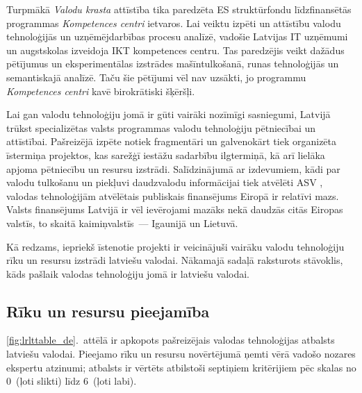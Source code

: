 \begin{multicols}{2}
Turpmākā \textit{Valodu krasta} attīstība tika paredzēta ES struktūrfondu līdzfinansētās programmas \textit{Kompetences centri} ietvaros.
Lai veiktu izpēti un attīstību valodu tehnoloģijās un uzņēmējdarbības procesu analīzē, vadošie Latvijas IT uzņēmumi un augstskolas izveidoja IKT kompetences centru.
Tas paredzējis veikt dažādus pētījumus un eksperimentālas izstrādes mašīntulkošanā, runas tehnoloģijās un semantiskajā analīzē.
Taču šie pētījumi vēl nav uzsākti, jo programmu \textit{Kompetences centri} kavē birokrātiski šķēršļi.

Lai gan valodu tehnoloģiju jomā ir gūti vairāki nozīmīgi sasniegumi, Latvijā trūkst specializētas valsts programmas valodu tehnoloģiju pētniecībai un attīstībai.
Pašreizējā izpēte notiek fragmentāri un galvenokārt tiek organizēta īstermiņa projektos, kas sarežģī iestāžu sadarbību ilgtermiņā, kā arī lielāka apjoma pētniecību un resursu izstrādi.
Salīdzinājumā ar izdevumiem, kādi par valodu tulkošanu un piekļuvi daudzvalodu informācijai tiek atvēlēti ASV \cite{Meta46}, valodas tehnoloģijām atvēlētais publiskais finansējums Eiropā ir relatīvi mazs.
Valsts finansējums Latvijā ir vēl ievērojami mazāks nekā daudzās citās Eiropas valstīs, to skaitā kaimiņvalstīs~--- Igaunijā un Lietuvā.

Kā redzams, iepriekš īstenotie projekti ir veicinājuši vairāku valodu tehnoloģiju rīku un resursu izstrādi latviešu valodai.
Nākamajā sadaļā raksturots stāvoklis, kāds pašlaik valodas tehnoloģiju jomā ir latviešu valodai.

\subsection{Rīku un resursu pieejamība}

\ref{fig:lrlttable_de}.~attēlā ir apkopots pašreizējais valodas tehnoloģijas atbalsts latviešu valodai.
Pieejamo rīku un resursu novērtējumā ņemti vērā vadošo nozares ekspertu atzinumi; atbalsts ir vērtēts atbilstoši septiņiem kritērijiem pēc skalas no 0~(ļoti slikti) līdz 6~(ļoti labi). 


\end{multicols}
